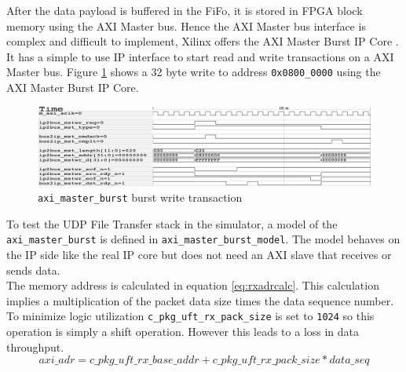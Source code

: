 After the data payload is buffered in the FiFo, it is stored in FPGA
block memory using the AXI Master bus. Hence the AXI Master bus interface is
complex and difficult to implement, Xilinx offers the AXI Master Burst IP Core
\cite{xilinx_amb}. It has a simple to use IP interface to start read and write
transactions on a AXI Master bus. Figure \ref{fig:ambwrburst} shows a 32 byte
write to address \texttt{0x0800\_0000} using the AXI Master Burst IP Core.
\\

\begin{figure}[tb!]
    \centering
    \includegraphics[width=\textwidth] {images/communication/ambwriteburst.png}
    \caption{\texttt{axi\_master\_burst} burst write transaction}
    \label{fig:ambwrburst}
\end{figure}

To test the UDP File Transfer stack in the simulator, a model of the 
\texttt{axi\_master\_burst} is defined in \texttt{axi\_master\_burst\_model}.
The model behaves on the IP side like the real IP core but does not need an AXI
slave that receives or sends data. 
\\

The memory address is calculated in equation \ref{eq:rxadrcalc}. This calculation implies
a multiplication of the packet data size times the data sequence number. To
minimize logic utilization \texttt{c\_pkg\_uft\_rx\_pack\_size} is set to
\texttt{1024} so this operation is simply a shift operation. However this leads
to a loss in data throughput. 
\begin{equation}
    axi\_adr = c\_pkg\_uft\_rx\_base\_addr + c\_pkg\_uft\_rx\_pack\_size * data\_seq
    \label{eq:rxadrcalc}
\end{equation}

%
%
\clearpage

